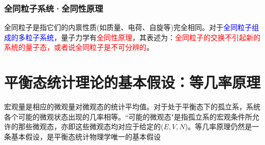 \documentclass[12pt,a4paper]{article}
\begin{document}
\subsubsection{全同粒子系统·全同性原理}
全同粒子是指它们的内禀性质(如质量、电荷、自旋等)完全相同。对于\textcolor{blue}{全同粒子组成的多粒子系统}，量子力学有\textcolor{red}{全同性原理}，其表述为：\textcolor{red}{全同粒子的交换不引起新的系统的量子态，或者说全同粒子是不可分辨的}。





















































\section{平衡态统计理论的基本假设：等几率原理}
宏观量是相应的微观量对微观态的统计平均值。对于处于平衡态下的孤立系，系统各个可能的微观状态出现的几率相等。``可能的微观态"是指孤立系的宏观条件所允许的那些微观态，亦即这些微观态均对应于给定的($E, V, N$)。等几率原理仍然是一条基本假设，是平衡态统计物理学唯一的基本假设
\end{document}
